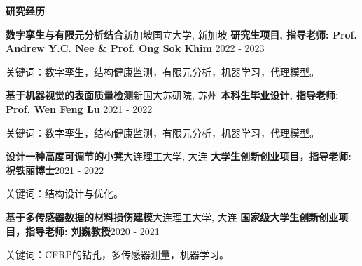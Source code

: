 \documentclass{resume} %
\begin{document}



\begin{rSection}{\bf {\fangsong 研究经历}}
\begin{rSubsection}{\bf {\fangsong 数字孪生与有限元分析结合}}{\fangsong 新加坡国立大学, 新加坡}
{\bf {\fangsong 研究生项目, 指导老师: Prof. Andrew Y.C. Nee \& Prof. Ong Sok Khim}  }{2022 - 2023}
	\item{\fangsong 关键词：数字孪生，结构健康监测，有限元分析，机器学习，代理模型。}\\
\end{rSubsection}

\begin{rSubsection}{\bf {\fangsong 基于机器视觉的表面质量检测}}{{\fangsong 新国大苏研院, 苏州}}
{\bf {\fangsong 本科生毕业设计, 指导老师: Prof. Wen Feng Lu}  }{2021 - 2022}
	\item{\fangsong 关键词：数字孪生，结构健康监测，有限元分析，机器学习，代理模型。}\\
\end{rSubsection}

\begin{rSubsection}{\bf {\fangsong 设计一种高度可调节的小凳}}{\fangsong 大连理工大学, 大连}
{\bf \fangsong 大学生创新创业项目，指导老师: 祝铁丽博士}{2021 - 2022}
	\item{\fangsong 关键词：结构设计与优化。}\\
\end{rSubsection}

\begin{rSubsection}{\bf \fangsong 基于多传感器数据的材料损伤建模}{\fangsong 大连理工大学, 大连}
{\bf \fangsong 国家级大学生创新创业项目，指导老师: 刘巍教授}{2020 - 2021}
	\item{\fangsong 关键词：CFRP的钻孔，多传感器测量，机器学习。}\\
\end{rSubsection}

\end{rSection}
\end{document}
